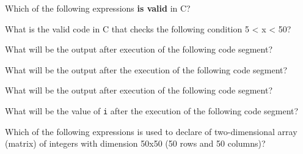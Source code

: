 \documentclass[11pt]{examdesign}
\begin{document}

\begin{multiplechoice}[title={},suppressprefix=yes,rearrange=yes]

\begin{question}
Which of the following expressions \textbf{is valid} in C?
\end{question}

\begin{question}
What is the valid code in C that checks the following condition 5 < x <
50?
\end{question}

\begin{question}
What will be the output after execution of the following code segment?
\end{question}

\begin{question}
What will be the output after the execution of the following code segment?
\end{question}
  
\begin{question}
What will be the output after execution of the following code segment?
\end{question}

\begin{question}
What will be the value of \texttt{i} after the execution of the following code segment?
\end{question}
\begin{question}
Which of the following expressions is used to declare of two-dimensional
array (matrix) of integers with dimension 50x50 (50 rows and 50 columns)?
\end{question}
  

\end{multiplechoice}
\end{document}
